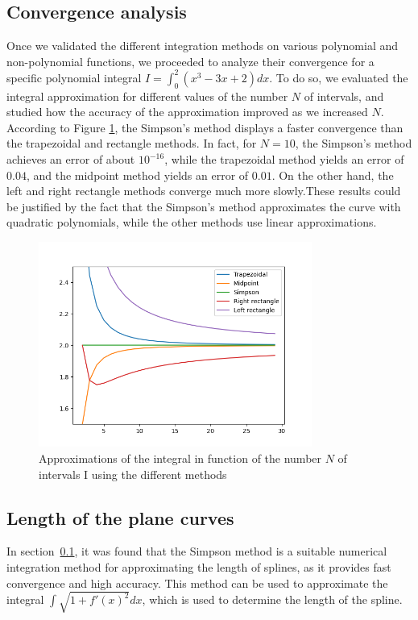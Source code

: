 \subsection{Convergence analysis}
\label{section}
Once we validated the different integration methods on various polynomial and non-polynomial functions, we proceeded to analyze their convergence for a specific polynomial integral $ I = \int_{0}^{2}(x^{3} -3x +2)dx$. To do so, we evaluated the integral approximation for different values of the number $N$ of intervals, and studied how the accuracy of the approximation improved as we increased $N$. \\
According to Figure \ref{fig:speed}, the Simpson's method displays a faster convergence than the trapezoidal and rectangle methods. In fact, for $N=10$, the Simpson's method achieves an error of about $10^{-16}$, while the trapezoidal method yields an error of $0.04$, and the midpoint method yields an error of $0.01$. On the other hand, the left and right rectangle methods converge much more slowly.These results could be justified by the fact that the Simpson's method approximates the curve with quadratic polynomials, while the other methods use linear approximations.\\
\begin{figure}[H]
  \label{fig:speed}
  \centering
  \includegraphics[width=0.8\textwidth]{tex/speed_convergence.png}
  \caption{Approximations of the integral in function of the number $N$ of intervals I using the different methods }  
\end{figure}

\subsection{Length of the plane curves} 
In section~\ref{section}, it was found that the Simpson method is a suitable numerical integration method for approximating the length of splines, as it provides fast convergence and high accuracy. This method can be used to approximate the integral $\int \sqrt{1+f'(x)^{2}}dx$, which is used to determine the length of the spline.

